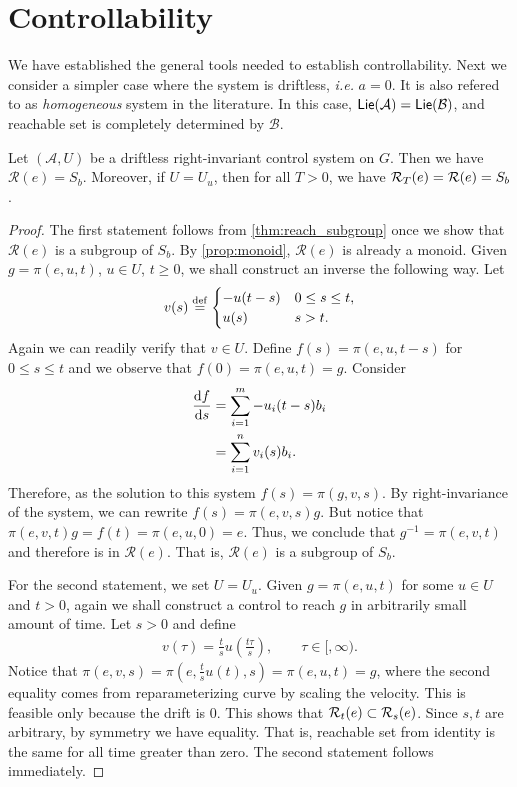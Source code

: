 \documentclass[12pt,class=article,crop=false]{standalone}
\begin{document}
\section{Controllability}
We have established the general tools needed to establish controllability. Next we consider a simpler case where the system is driftless, \emph{i.e.} $ a=0$. It is also refered to as \emph{homogeneous} system in the literature. In this case, $ \mathsf{Lie}( \mathcal{ A}) = \mathsf{Lie}( \mathcal{ B})$, and reachable set is completely determined by $ \mathcal{ B}$.
\begin{theorem}\label{thm:driftless} 
Let $ (\mathcal{A},U)$ be a driftless right-invariant control system on $G$. Then we have $ \mathcal{R}( e) = S_b$. Moreover, if $ U = U_u$, then for all  $ T>0$, we have  $ \mathcal{R}_T( e) = \mathcal{R}( e) = S_b $.
\end{theorem}
\begin{proof}
The first statement follows from \cref{thm:reach_subgroup} once we show that $ \mathcal{R}( e) $ is a subgroup of $ S_b$. By \cref{prop:monoid}, $ \mathcal{R}( e) $ is already a monoid. Given $ g = \pi( e,u,t)$, $ u \in U$, $ t\geq 0$, we shall construct an inverse the following way. Let
 \begin{align*}
	v(s) \stackrel{\mathrm{def}}{=} \begin{cases}
		-u(t-s) & 0\leq s \leq t,\\
		u(s) & s>t .
	\end{cases}
\end{align*}
Again we can readily verify that $ v \in U$. Define $ f(s) = \pi( e,u,t-s)$ for $ 0\leq s \leq t$ and we observe that $ f(0) = \pi( e,u,t) = g$. Consider
\begin{align*}
	\frac{\mathrm{d} f}{\mathrm{d} s } &= \sum_{ i= 1}^{ m} -u_i(t-s) b_i\\
	&= \sum_{ i= 1}^{ n} v_i(s) b_i  .
\end{align*}
Therefore, as the solution to this system $ f(s) = \pi( g,v,s)$. By right-invariance of the system, we can rewrite $ f(s) = \pi( e,v,s) g$. But notice that $ \pi( e,v,t)g = f(t) = \pi( e,u,0) = e$. Thus, we conclude that $ g^{-1} = \pi( e,v,t)$ and therefore is in $ \mathcal{R}( e) $. That is, $ \mathcal{R}( e) $ is a subgroup of $ S_b$.

For the second statement, we set $ U = U_u$. Given  $ g = \pi( e,u,t)$ for some $ u \in U$ and $ t> 0$, again we shall construct a control to reach  $ g$ in arbitrarily small amount of time. Let $ s>0$ and  define
 \begin{align*}
	v(\tau) = \frac{t}{s} u\left( \frac{t \tau}{ s} \right) , \qquad \tau \in [,\infty).
\end{align*}
Notice that $ \pi( e,v,s) = \pi\left( e, \frac{t}{s} u(t),s \right) = \pi( e,u,t) =g$, where the second equality comes from reparameterizing curve by scaling the velocity. This is feasible only because the drift is 0. This shows that $ \mathcal{R}_t( e)  \subset \mathcal{R}_s( e)$. Since $ s,t$ are arbitrary, by symmetry we have equality. That is, reachable set from identity is the same for all time greater than zero. The second statement follows immediately.
\end{proof}
\end{document}
